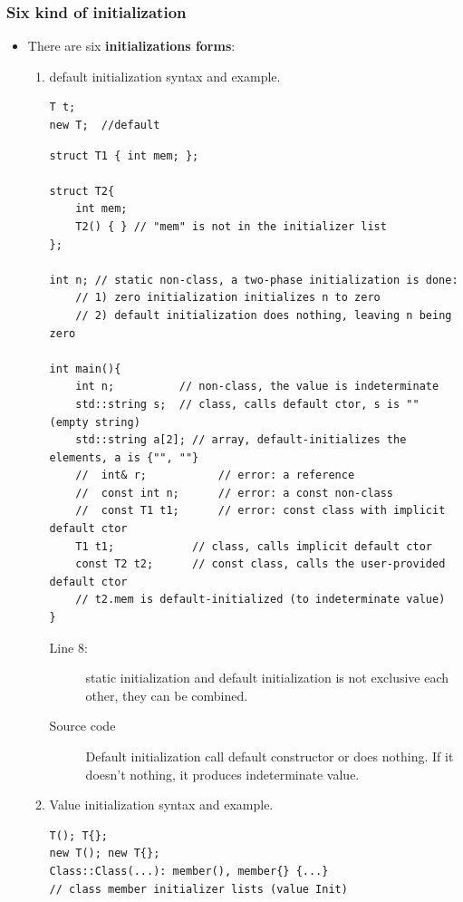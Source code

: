 \documentclass[a4paper,11pt,twoside]{book}
\begin{document}
\subsubsection{Six kind of initialization}
\begin{itemize}
	\item There are six \textbf{initializations forms}:
	\begin{enumerate}
		\item default initialization syntax and example.
\begin{lstlisting}[numbers=none]
T t;
new T;  //default
\end{lstlisting}

	
\begin{lstlisting}
struct T1 { int mem; };

struct T2{
	int mem;
	T2() { } // "mem" is not in the initializer list
};

int n; // static non-class, a two-phase initialization is done:
	// 1) zero initialization initializes n to zero
	// 2) default initialization does nothing, leaving n being zero

int main(){
	int n;          // non-class, the value is indeterminate
	std::string s;  // class, calls default ctor, s is "" (empty string)
	std::string a[2]; // array, default-initializes the elements, a is {"", ""}
	//  int& r;           // error: a reference
	//  const int n;      // error: a const non-class
	//  const T1 t1;      // error: const class with implicit default ctor
	T1 t1;            // class, calls implicit default ctor
	const T2 t2;      // const class, calls the user-provided default ctor
	// t2.mem is default-initialized (to indeterminate value)
}
\end{lstlisting}

\begin{description}
	\item[Line 8:] static initialization and default initialization is not exclusive each other, they can be combined. 
	\item[Source code] Default initialization call default constructor or does nothing. If it doesn't nothing, it produces indeterminate value.
\end{description}


		\item Value initialization syntax and example.
\begin{lstlisting}[numbers=none]
T(); T{};
new T(); new T{};
Class::Class(...): member(), member{} {...} 
// class member initializer lists (value Init)
\end{lstlisting}



\end{enumerate}
\end{itemize}
\end{document}
